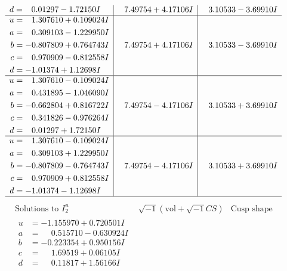 \documentclass[1p]{elsarticle_modified}
\theoremstyle{definition}
\newcommand{\I}{\sqrt{-1}}
\begin{document}
$$\begin{array}{c|c|c}
\begin{aligned}
d &= \phantom{-}0.01297 - 1.72150 I\end{aligned}
 & \phantom{-}7.49754 + 4.17106 I & \phantom{-}3.10533 - 3.69910 I \\ \hline\begin{aligned}
u &= \phantom{-}1.307610 + 0.109024 I \\
a &= \phantom{-}0.309103 - 1.229950 I \\
b &= -0.807809 + 0.764743 I \\
c &= \phantom{-}0.970909 - 0.812558 I \\
d &= -1.01374 + 1.12698 I\end{aligned}
 & \phantom{-}7.49754 + 4.17106 I & \phantom{-}3.10533 - 3.69910 I \\ \hline\begin{aligned}
u &= \phantom{-}1.307610 - 0.109024 I \\
a &= \phantom{-}0.431895 - 1.046090 I \\
b &= -0.662804 + 0.816722 I \\
c &= \phantom{-}0.341826 - 0.976264 I \\
d &= \phantom{-}0.01297 + 1.72150 I\end{aligned}
 & \phantom{-}7.49754 - 4.17106 I & \phantom{-}3.10533 + 3.69910 I \\ \hline\begin{aligned}
u &= \phantom{-}1.307610 - 0.109024 I \\
a &= \phantom{-}0.309103 + 1.229950 I \\
b &= -0.807809 - 0.764743 I \\
c &= \phantom{-}0.970909 + 0.812558 I \\
d &= -1.01374 - 1.12698 I\end{aligned}
 & \phantom{-}7.49754 - 4.17106 I & \phantom{-}3.10533 + 3.69910 I\\
 \hline 
 \end{array}$$\newpage$$\begin{array}{c|c|c}  
\text{Solutions to }I^u_{2}& \I (\text{vol} + \sqrt{-1}CS) & \text{Cusp shape}\\
 \hline 
\begin{aligned}
u &= -1.155970 + 0.720501 I \\
a &= \phantom{-}0.515710 - 0.630924 I \\
b &= -0.223354 + 0.950156 I \\
c &= \phantom{-}1.69519 + 0.06105 I \\
d &= \phantom{-}0.11817 + 1.56166 I\end{aligned}

\end{array}$$
\end{document}
